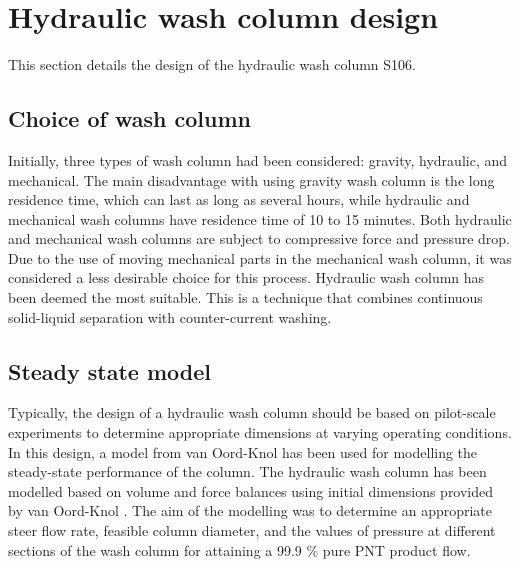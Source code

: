 \section{Hydraulic wash column design}\label{section: hydraulic wash column}

This section details the design of the hydraulic wash column S106.

\subsection{Choice of wash column}   

 Initially, three types of wash column had been considered: gravity, hydraulic, and mechanical. The main disadvantage with using gravity wash column is the long residence time, which can last as long as several hours, while hydraulic and mechanical wash columns have residence time of 10 to 15 minutes. Both hydraulic and mechanical wash columns are subject to compressive force and pressure drop. Due to the use of moving mechanical parts in the mechanical wash column, it was considered a less desirable choice for this process. Hydraulic wash column has been deemed the most suitable. This is a technique that combines continuous solid-liquid separation with counter-current washing. 

\subsection{Steady state model}   

Typically, the design of a hydraulic wash column should be based on pilot-scale experiments to determine appropriate dimensions at varying operating conditions. In this design, a model from van Oord-Knol \cite{van_oord-knol_hydraulic_2000} has been used for modelling the steady-state performance of the column. The hydraulic wash column has been modelled based on volume and force balances using initial dimensions provided by van Oord-Knol \cite{oordknol_dynamic_2002}. The aim of the modelling was to determine an appropriate steer flow rate, feasible column diameter, and the values of pressure at different sections of the wash column for attaining a 99.9 \% pure PNT product flow.  




